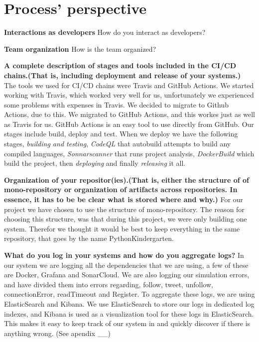 \section{Process' perspective}

\textbf{Interactions as developers}\newline
 How do you interact as developers?\newline
 
\newline
\textbf{Team organization}\newline
  How is the team organized?\newline
  
  \newline
  \textbf{A complete description of stages and tools included in the CI/CD chains.(That is, including deployment and release of your systems.)}\newline
  The tools we used for CI/CD chains were Travis and GitHub Actions. We started working with Travis, which worked very well for us, unfortunately we experienced some problems with expenses in Travis. We decided to migrate to Github Actions, due to this.
  We migrated to GitHub Actions, and this workes just as well as Travis for us. GitHub Actions is an easy tool to use directly from GitHub. 
  Our stages include build, deploy and test. When we deploy we have the following stages, \textit{building and testing}, \textit{CodeQL} that autobuild attempts to build any compiled languages, \textit{Sonnarscanner} that runs project analysis, \textit{DockerBuild} which build the project, then \textit{deploying} and finally \textit{releasing} it all.\newline

  \newline
  \textbf{Organization of your repositor(ies).(That is, either the structure of of mono-repository or organization of artifacts across repositories. In essence, it has to be be clear what is stored where and why.)} \newline
  For our project we have chosen to use the structure of mono-repository. The reason for choosing this structure, was that during this project, we were only building one system. Therefor we thought it would be best to keep everything in the same repository, that goes by the name PythonKindergarten. \newline
  
  \newline
  \textbf{What do you log in your systems and how do you aggregate logs?}  \newline
  In our system we are logging all the dependencies that we are using, a few of these are Docker, Grafana and SonarCloud. 
  We are also logging our simulation errors, and have divided them into errors regarding, follow, tweet, unfollow, connectionError, readTimeout and Register.
  To aggregate these logs, we are using ElasticSearch and Kibana. We use ElasticSearch to store our logs in dedicated log indexes, and Kibana is used as a visualization tool for these logs in ElasticSearch. This makes it easy to keep track of our system in and quickly discover if there is anything wrong. (See apendix __) \newline

